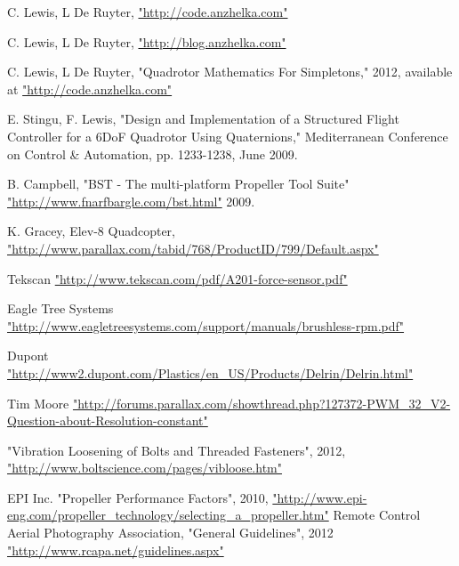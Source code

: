 \documentclass{article}
\numberwithin{equation}{section} %
\begin{document}
\begin{thebibliography}{99}


	C. Lewis, L De Ruyter,
	\url{"http://code.anzhelka.com"}
	
	C. Lewis, L De Ruyter,
	\url{"http://blog.anzhelka.com"}

	C. Lewis, L De Ruyter,
	"Quadrotor Mathematics For Simpletons," 2012, available at \url{"http://code.anzhelka.com"}
	
	E. Stingu, F. Lewis, 
	"Design and Implementation of a Structured Flight Controller for a 6DoF Quadrotor Using Quaternions," 
	Mediterranean Conference on Control \& Automation, pp. 1233-1238, June 2009.
	
	B. Campbell, 
	"BST - The multi-platform Propeller Tool Suite" 
	\url{"http://www.fnarfbargle.com/bst.html"} 2009.

	K. Gracey,
	Elev-8 Quadcopter, \url{"http://www.parallax.com/tabid/768/ProductID/799/Default.aspx"}
	
	Tekscan\textregistered 
	\url{"http://www.tekscan.com/pdf/A201-force-sensor.pdf"}
	
	Eagle Tree Systems \textregistered
	\url{"http://www.eagletreesystems.com/support/manuals/brushless-rpm.pdf"}

	Dupont\texttrademark
	\url{"http://www2.dupont.com/Plastics/en_US/Products/Delrin/Delrin.html"}
	
	Tim Moore
	\url{"http://forums.parallax.com/showthread.php?127372-PWM_32_V2-Question-about-Resolution-constant"}
	
	
	"Vibration Loosening of Bolts and Threaded Fasteners", 2012,
	\url{"http://www.boltscience.com/pages/vibloose.htm"}
	
	EPI Inc. "Propeller Performance Factors", 2010, \url{"http://www.epi-eng.com/propeller_technology/selecting_a_propeller.htm"}
	Remote Control Aerial Photography Association, "General Guidelines", 2012 \url{"http://www.rcapa.net/guidelines.aspx"}
	

\end{thebibliography}
\end{document}
